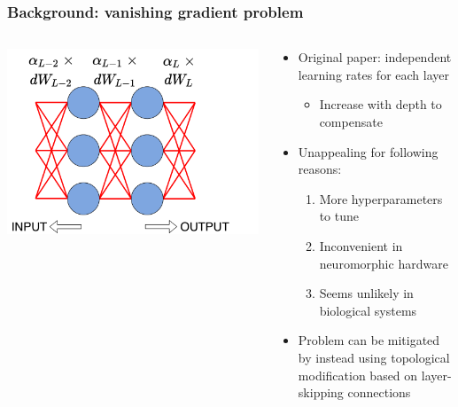\documentclass[pdf]{beamer}
\begin{document}
\begin{frame}
\frametitle{Background: vanishing gradient problem}
\begin{columns}
	\begin{column}{.5\textwidth}
		\includegraphics[width=\textwidth]{figures/perlayer_illustration.pdf}
	\end{column}
	\begin{column}{.5\textwidth}
		\begin{itemize}
			\item<1-> Original paper: independent learning rates for each layer
			\begin{itemize}
				\item<2-> Increase with depth to compensate
			\end{itemize}
			\item<3-> Unappealing for following reasons:
			\begin{enumerate}
				\item<4-> More hyperparameters to tune
				\item<5-> Inconvenient in neuromorphic hardware
				\item<6-> Seems unlikely in biological systems
			\end{enumerate}
			\item<7-> Problem can be mitigated by instead using topological modification based on layer-skipping connections
		\end{itemize}
	\end{column}
\end{columns}
\end{frame}
\end{document}
